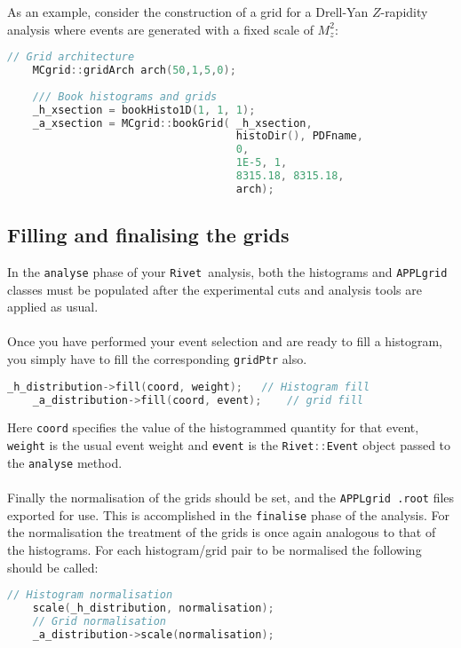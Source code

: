 \documentclass[11pt]{article}
\newcommand{\rivet} {{\tt Rivet }}
\newcommand{\appl} {{\tt APPLgrid }}
\begin{document}
 As an example, consider the construction of a grid for a Drell-Yan $Z$-rapidity analysis where events are generated with a fixed scale of $M_z^2$:
   \begin{lstlisting}[language=c++]
    // Grid architecture
    MCgrid::gridArch arch(50,1,5,0);
   
    /// Book histograms and grids
    _h_xsection = bookHisto1D(1, 1, 1);
    _a_xsection = MCgrid::bookGrid(	_h_xsection,
    								histoDir(), PDFname,
     								0, 
									1E-5, 1,
									8315.18, 8315.18,
									arch);
\end{lstlisting}

\subsection{Filling and finalising the grids}
In the \lstinline[language=c++]{analyse} phase of your \rivet analysis, both the histograms and \appl classes must be populated after the experimental cuts and analysis tools are applied as usual.\\\\
Once you have performed your event selection and are ready to fill a histogram, you simply have to fill the corresponding \lstinline[language=c++]{gridPtr} also. 
   \begin{lstlisting}[language=c++]
	_h_distribution->fill(coord, weight);	// Histogram fill  
	_a_distribution->fill(coord, event);	// grid fill
\end{lstlisting}
Here \lstinline[language=c++]{coord} specifies the value of the histogrammed quantity for that event, \lstinline[language=c++]{weight} is the usual event weight and \lstinline[language=c++]{event} is the \lstinline[language=c++]{Rivet::Event} object passed to the \lstinline[language=c++]{analyse} method.
\\\\
Finally the normalisation of the grids should be set, and the \appl \lstinline[language=bash]{.root} files exported for use. This is accomplished in the \lstinline[language=c++]{finalise} phase of the analysis. For the normalisation the treatment of the grids is once again analogous to that of the histograms. For each histogram/grid pair to be normalised the following should be called:
   \begin{lstlisting}[language=c++]
	// Histogram normalisation
	scale(_h_distribution, normalisation);	
	// Grid normalisation
	_a_distribution->scale(normalisation);	
\end{lstlisting}
\end{document}
